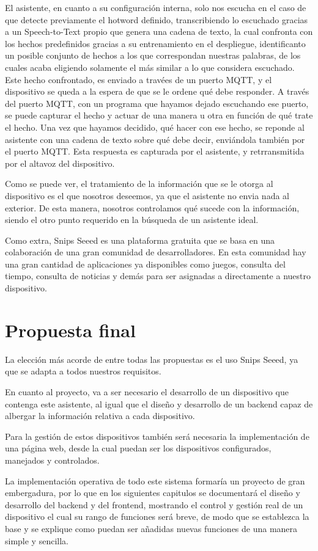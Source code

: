 El asistente, en cuanto a su configuración interna, solo nos escucha en el caso de que detecte previamente el hotword definido, transcribiendo lo escuchado gracias a un Speech-to-Text propio que genera una cadena de texto, la cual confronta con los hechos predefinidos gracias a su entrenamiento en el despliegue, identificanto un posible conjunto de hechos a los que correspondan nuestras palabras, de los cuales acaba eligiendo solamente el más similar a lo que considera escuchado.
Este hecho confrontado, es enviado a travées de un puerto MQTT, y el dispositivo se queda a la espera de que se le ordene qué debe responder.
A través del puerto MQTT, con un programa que hayamos dejado escuchando ese puerto, se puede capturar el hecho y actuar de una manera u otra en función de qué trate el hecho.
Una vez que hayamos decidido, qué hacer con ese hecho, se reponde al asistente con una cadena de texto sobre qué debe decir, enviándola también por el puerto MQTT.
Esta respuesta es capturada por el asistente, y retrransmitida por el altavoz del dispositivo.

Como se puede ver, el tratamiento de la información que se le otorga al dispositivo es el que nosotros deseemos, ya que el asistente no envia nada al exterior. De esta manera, nosotros controlamos qué sucede con la información, siendo el otro punto requerido en la búsqueda de un asistente ideal.

Como extra, Snips Seeed es una plataforma gratuita que se basa en una colaboración de una gran comunidad de desarrolladores. En esta comunidad hay una gran cantidad de aplicaciones ya disponibles como juegos, consulta del tiempo, consulta de noticias y demás para ser asignadas a directamente a nuestro dispositivo.

\section{Propuesta final}

La elección más acorde de entre todas las propuestas es el uso Snips Seeed, ya que se adapta a todos nuestros requisitos.

En cuanto al proyecto, va a ser necesario el desarrollo de un dispositivo que contenga este asistente, al igual que el diseño y desarrollo de un backend capaz de albergar la información relativa a cada dispositivo.

Para la gestión de estos dispositivos también será necesaria la implementación de una página web, desde la cual puedan ser los dispositivos configurados, manejados y controlados.

La implementación operativa de todo este sistema formaría un proyecto de gran embergadura, por lo que en los siguientes capitulos se documentará el diseño y desarrollo del backend y del frontend, mostrando el control y gestión real de un dispositivo el cual su rango de funciones será breve, de modo que se establezca la base y se explique como puedan ser añadidas nuevas funciones de una manera simple y sencilla.
